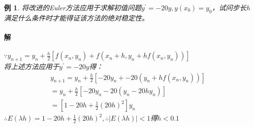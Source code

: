 \documentclass{article}
\newtheorem{example}{例}
\begin{document}
\begin{example}
    将改进的Euler方法应用于求解初值问题$y^{'}=-20y, y(x_0)=y_0 $，试问步长h满足什么条件时才能得证该方法的绝对稳定性。
    
    \paragraph{解}$\because y_{n+1}=y_n+\frac{h}{2}[f(x_n, y_n)+f(x_n+h, y_n+hf(x_n,y_n))] $\\
    将上述方法应用于$y^{'}=-20y$得：
    $$
    \begin{array}{lr}
        y_{n+1}=y_n+\frac{h}{2}[-20y_n+-20(y_n+hf(x_n, y_n))]\\
        =y_n+\frac{h}{2}[-20y_n-20(y_n-20hy_n)] \\
        =[1-20h+\frac{1}{2}(20h)^2]y_n
    \end{array}
    $$
    $\therefore E(\lambda h)=1-20h+\frac{1}{2}(20h)^2, \therefore |E(\lambda h)|<1 $得$h <0.1$
\end{example}
\end{document}
